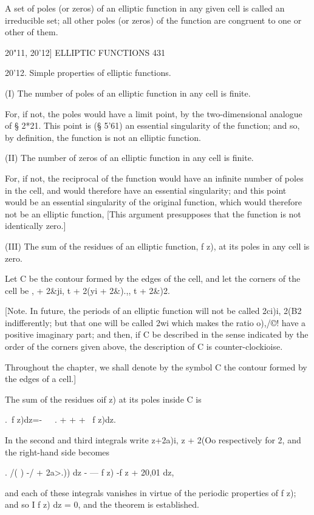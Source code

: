 A set of poles (or zeros) of an elliptic function in any given cell is
called an irreducible set; all other poles (or zeros) of the function
are congruent to one or other of them.

20"11, 20'12] ELLIPTIC FUNCTIONS 431

20'12. Simple properties of elliptic functions.

(I) The number of poles of an elliptic function in any cell is finite.

For, if not, the poles would have a limit point, by the
two-dimensional analogue of § 2*21. This point is (§ 5'61) an
essential singularity of the function; and so, by definition, the
function is not an elliptic function.

(II) The number of zeros of an elliptic function in any cell is
finite.

For, if not, the reciprocal of the function would have an infinite
number of poles in the cell, and would therefore have an essential
singularity; and this point would be an essential singularity of the
original function, which would therefore not be an elliptic function,
[This argument presupposes that the function is not identically zero.]

(III) The sum of the residues of an elliptic function, f z), at its
poles in any cell is zero.

Let C be the contour formed by the edges of the cell, and let the
corners of the cell be , + 2\&ji, t + 2(yi + 2\&).,, t + 2\&)2.

[Note. In future, the periods of an elliptic function will not be
called 2ci)i, 2(B2 indifferently; but that one will be called 2wi
which makes the ratio o),/©! have a positive imaginary part; and
then, if C be described in the sense indicated by the order of the
corners given above, the description of C is counter-clockioise.

Throughout the chapter, we shall denote by the symbol C the contour
formed by the edges of a cell.]

The sum of the residues oif z) at its poles inside C is

 .\ f z)dz=-~\ \ . + + + \ f z)dz.

In the second and third integrals write z+2a)i, z + 2(Oo respectively
for 2, and the right-hand side becomes

 . /( ) -/ + 2a>.)) dz - — f z) -f z + 20,01 dz,

and each of these integrals vanishes in virtue of the periodic
properties of f z); and so I f z) dz = 0, and the theorem is
established.

